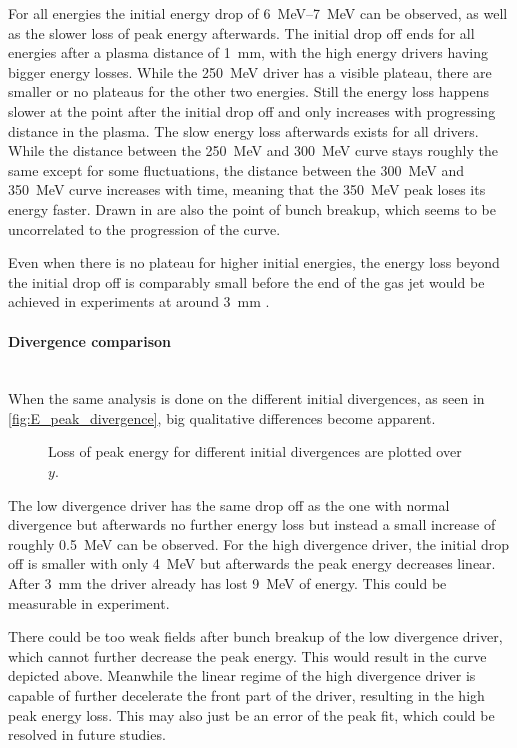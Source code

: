 \documentclass[bachelor_thesis]{subfiles}
\begin{document}
For all energies the initial energy drop of \qtyrange{6}{7}{\MeV} can be observed, as well as the slower loss of peak energy afterwards. The initial drop off ends for all energies after a plasma distance of \qty{1}{\mm}, with the high energy drivers having bigger energy losses. 
While the \qty{250}{\MeV} driver has a visible plateau, there are smaller or no plateaus for the other two energies. Still the energy loss happens slower at the point after the initial drop off and only increases with progressing distance in the plasma.
The slow energy loss afterwards exists for all drivers. While the distance between the \qty{250}{\MeV} and \qty{300}{\MeV} curve stays roughly the same except for some fluctuations, 
the distance between the \qty{300}{\MeV} and \qty{350}{\MeV} curve increases with time, meaning that the \qty{350}{\MeV} peak loses its energy faster. Drawn in are also the point of bunch breakup, which seems to be uncorrelated to the progression of the curve.

Even when there is no plateau for higher initial energies, the energy loss beyond the initial drop off is comparably small before the end of the gas jet would be achieved in experiments at around \qty{3}{\mm} \cite{Schoebel2022}.

\paragraph*{Divergence comparison}\hspace{0pt} \\
When the same analysis is done on the different initial divergences, as seen in \autoref{fig:E_peak_divergence}, big qualitative differences become apparent. 
\begin{figure}
	\centering
	\missingfigure{}
	\caption{Loss of peak energy for different initial divergences are plotted over $y$.}
	\label{fig:E_peak_divergence}
\end{figure}
The low divergence driver has the same drop off as the one with normal divergence but afterwards no further energy loss but instead a small increase of roughly \qty{0.5}{\MeV} can be observed.
For the high divergence driver, the initial drop off is smaller with only \qty{4}{\MeV} but afterwards the peak energy decreases linear. After \qty{3}{\mm} the driver already has lost \qty{9}{\MeV} of energy. This could be measurable in experiment.

There could be too weak fields after bunch breakup of the low divergence driver, which cannot further decrease the peak energy. This would result in the curve depicted above. 
Meanwhile the linear regime of the high divergence driver is capable of further decelerate the front part of the driver, resulting in the high peak energy loss. This may also just be an error of the peak fit, which could be resolved in future studies.
\end{document}
